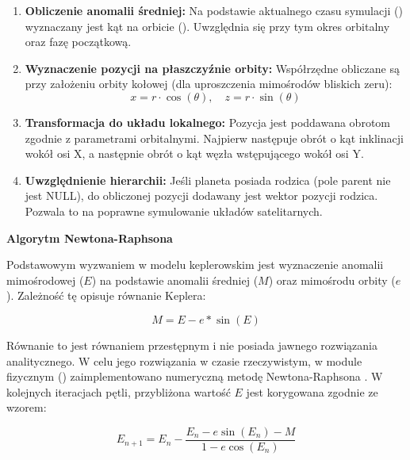          \begin{enumerate}
             \item \textbf{Obliczenie anomalii średniej:} Na podstawie aktualnego czasu symulacji () wyznaczany jest kąt na orbicie (). Uwzględnia się przy tym okres orbitalny oraz fazę początkową.
             \item \textbf{Wyznaczenie pozycji na płaszczyźnie orbity:} Współrzędne obliczane są przy założeniu orbity kołowej (dla uproszczenia mimośrodów bliskich zeru):
                 \begin{equation}
                 x = r \cdot \cos(\theta), \quad z = r \cdot \sin(\theta)
                 \end{equation}
             \item \textbf{Transformacja do układu lokalnego:} Pozycja jest poddawana obrotom zgodnie z parametrami orbitalnymi. Najpierw następuje obrót o kąt inklinacji wokół osi X, a następnie obrót o kąt węzła wstępującego wokół osi Y.
             \item \textbf{Uwzględnienie hierarchii:} Jeśli planeta posiada rodzica (pole parent nie jest NULL), do obliczonej pozycji dodawany jest wektor pozycji rodzica. Pozwala to na poprawne symulowanie układów satelitarnych.
         \end{enumerate}

         \newpage

         \textbf{Algorytm Newtona-Raphsona}
         
         \bigbreak

         Podstawowym wyzwaniem w modelu keplerowskim jest wyznaczenie anomalii mimośrodowej ($E$) na podstawie anomalii średniej ($M$) oraz mimośrodu orbity ($e$).
         Zależność tę opisuje równanie Keplera:

         \begin{equation}
         M = E - e * \sin(E)
         \end{equation}

         Równanie to jest równaniem przestępnym i nie posiada jawnego rozwiązania analitycznego.
         W celu jego rozwiązania w czasie rzeczywistym, w module fizycznym () zaimplementowano numeryczną metodę Newtona-Raphsona \cite{article_nijenhuis_kepler_equation}.
         W kolejnych iteracjach pętli, przybliżona wartość $E$ jest korygowana zgodnie ze wzorem:

         \begin{equation}
         E_{n+1} = E_n - \frac{E_n - e \sin(E_n) - M}{1 - e \cos(E_n)}
         \end{equation}

